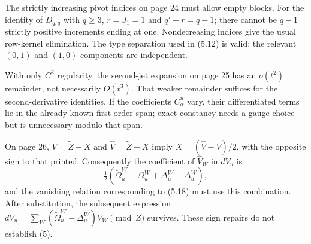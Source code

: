 \documentclass[10pt]{article}
\begin{document}
The strictly increasing pivot indices on page 24 must allow empty blocks. For the identity of \(D_{q,q}\) with \(q\ge3\), \(r=J_1=1\) and \(q'-r=q-1\); there cannot be \(q-1\) strictly positive increments ending at one. Nondecreasing indices give the usual row-kernel elimination. The type separation used in (5.12) is valid: the relevant \((0,1)\) and \((1,0)\) components are independent.\par
With only \(C^2\) regularity, the second-jet expansion on page 25 has an \(o(t^2)\) remainder, not necessarily \(O(t^3)\). That weaker remainder suffices for the second-derivative identities. If the coefficients \(C_\alpha^u\) vary, their differentiated terms lie in the already known first-order span; exact constancy needs a gauge choice but is unnecessary modulo that span.\par
On page 26, \(V=\widetilde Z-X\) and \(\widehat V=\widetilde Z+X\) imply \(X=(\widehat V-V)/2\), with the opposite sign to that printed. Consequently the coefficient of \(\widehat V_W\) in \(dV_u\) is \[\tfrac12(\widetilde\Omega_u^W-\Omega_u^W+
             \Delta_u^W-\overline{\Delta_u^W}),\] and the vanishing relation corresponding to (5.18) must use this combination. After substitution, the subsequent expression \(dV_u=\sum_W(\widetilde\Omega_u^W-\overline{\Delta_u^W})V_W
\pmod Z\) survives. These sign repairs do not establish (5).\par
\end{document}
